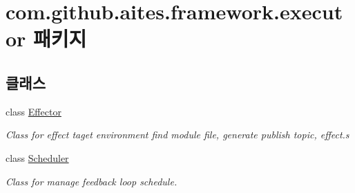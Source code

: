 \hypertarget{namespacecom_1_1github_1_1aites_1_1framework_1_1executor}{}\section{com.\+github.\+aites.\+framework.\+executor 패키지}
\label{namespacecom_1_1github_1_1aites_1_1framework_1_1executor}
\subsection*{클래스}
\begin{DoxyCompactItemize}
\item 
class \mbox{\hyperlink{classcom_1_1github_1_1aites_1_1framework_1_1executor_1_1_effector}{Effector}}
\begin{DoxyCompactList}\small\item\em Class for effect taget environment find module file, generate publish topic, effect.\+s \end{DoxyCompactList}\item 
class \mbox{\hyperlink{classcom_1_1github_1_1aites_1_1framework_1_1executor_1_1_scheduler}{Scheduler}}
\begin{DoxyCompactList}\small\item\em Class for manage feedback loop schedule. \end{DoxyCompactList}\end{DoxyCompactItemize}

